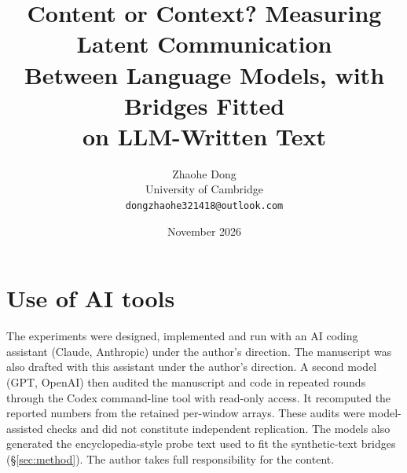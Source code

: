 \documentclass[11pt]{article}
\title{\textbf{Content or Context? Measuring Latent Communication\\ Between Language Models, with Bridges Fitted\\ on LLM-Written Text}}
\author{Zhaohe Dong\\[2pt]
University of Cambridge\\[2pt]
\texttt{dongzhaohe321418@outlook.com}}
\date{November 2026}
\begin{document}
\maketitle
\thispagestyle{fancy}






\section*{Use of AI tools}
The experiments were designed, implemented and run with an AI coding assistant (Claude, Anthropic) under the author's direction. The manuscript was also drafted with this assistant under the author's direction. A second model (GPT, OpenAI) then audited the manuscript and code in repeated rounds through the Codex command-line tool with read-only access. It recomputed the reported numbers from the retained per-window arrays. These audits were model-assisted checks and did not constitute independent replication. The models also generated the encyclopedia-style probe text used to fit the synthetic-text bridges (\S\ref{sec:method}). The author takes full responsibility for the content.




\appendix


\end{document}

